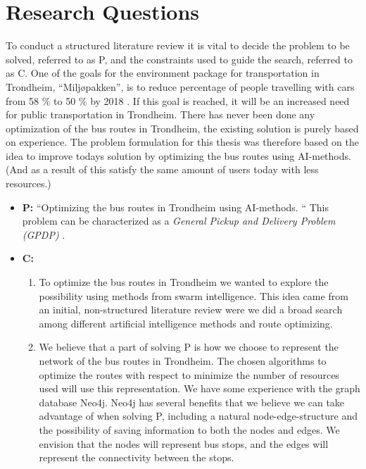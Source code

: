 \section{Research Questions}
To conduct a structured literature review it is vital to decide the problem to be solved, referred to as P, and the constraints used to guide the search, referred to as C.
\newline
\newline
One of the goals for the environment package for transportation in Trondheim, ``Miljøpakken'', is to reduce percentage of people travelling with cars from 58 \% to 50 \% by 2018 \citep{website:miljopakken}. If this goal is reached, it will be an increased need for public transportation in Trondheim. There has never been done any optimization of the bus routes in Trondheim, the existing solution is purely based on experience. The problem formulation for this thesis was therefore based on the idea to improve todays solution by optimizing the bus routes using AI-methods. (And as a result of this satisfy the same amount of users today with less resources.)

\begin{itemize}
\item \textbf{P:} “Optimizing the bus routes in Trondheim using AI-methods. “ This problem can be characterized as a \textit{General Pickup and Delivery Problem (GPDP)} \citep[p.22-25]{vehiclerouting}.  
\item \textbf{C:} 
    \begin{enumerate}
        \item To optimize the bus routes in Trondheim we wanted to explore the possibility using methods from swarm intelligence. This idea came from an initial, non-structured literature review were we did a broad search among different artificial intelligence methods and route optimizing. %
        \item We believe that a part of solving P is how we choose to represent the network of the bus routes in Trondheim. The chosen algorithms to optimize the routes with respect to minimize the number of resources used will use this representation. We have some experience with the graph database Neo4j. Neo4j has several benefits that we believe we can take advantage of when solving P, including a natural node-edge-structure and the possibility of saving information to both the nodes and edges. We envision that the nodes will represent bus stops, and the edges will represent the connectivity between the stops. 
    \end{enumerate}
\end{itemize}

